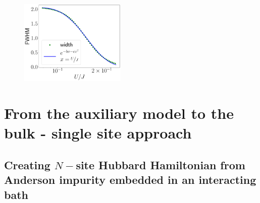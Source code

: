 \documentclass{report}
\numberwithin{equation}{section}
\begin{document}
\begin{figure}[!htpb]
	\centering
	\includegraphics[width=0.45\textwidth]{../figures/spec_func_width_fit.pdf}
\end{figure}


\chapter{From the auxiliary model to the bulk - single site approach}

\section{Creating \(N-\)site Hubbard Hamiltonian from Anderson impurity embedded in an interacting bath}
\end{document}
